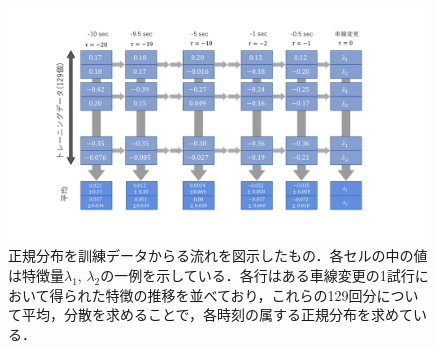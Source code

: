 \begin{figure}[htbp]
  \centering
    \includegraphics[width=11cm,keepaspectratio]{fig/training_flow.pdf}
  \caption{正規分布を訓練データからる流れを図示したもの．各セルの中の値は特徴量$\lambda_1$, $\lambda_2$の一例を示している．各行はある車線変更の1試行において得られた特徴の推移を並べており，これらの129回分について平均，分散を求めることで，各時刻の属する正規分布を求めている．}
  \label{fig:training_flow}
\end{figure}
